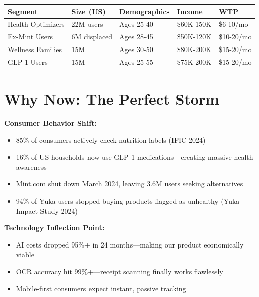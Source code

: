 \documentclass[11pt,a4paper]{report}
\begin{document}
\begin{center}
\renewcommand{\arraystretch}{1.5}
\begin{tabular}{>{\raggedright\arraybackslash}p{4cm} >{\centering\arraybackslash}p{2cm} >{\centering\arraybackslash}p{3cm} >{\centering\arraybackslash}p{2.5cm} >{\centering\arraybackslash}p{2cm}}
\toprule
\rowcolor{kbcblue!15}
\textbf{Segment} & \textbf{Size (US)} & \textbf{Demographics} & \textbf{Income} & \textbf{WTP} \\
\midrule
\rowcolor{healthgreen!8}
Health Optimizers & 22M users & Ages 25-40 & \$60K-150K & \$6-10/mo \\
Ex-Mint Users & 6M displaced & Ages 28-45 & \$50K-120K & \$10-20/mo \\
\rowcolor{healthgreen!8}
Wellness Families & 15M & Ages 30-50 & \$80K-200K & \$15-20/mo \\
GLP-1 Users & 15M+ & Ages 25-55 & \$75K-200K & \$15-20/mo \\
\bottomrule
\end{tabular}
\end{center}

\section{Why Now: The Perfect Storm}

\textbf{Consumer Behavior Shift:}
\begin{itemize}[leftmargin=2em, itemsep=4pt]
    \item 85\% of consumers actively check nutrition labels (IFIC 2024)
    \item 16\% of US households now use GLP-1 medications---creating massive health awareness
    \item Mint.com shut down March 2024, leaving 3.6M users seeking alternatives
    \item 94\% of Yuka users stopped buying products flagged as unhealthy (Yuka Impact Study 2024)
\end{itemize}

\textbf{Technology Inflection Point:}
\begin{itemize}[leftmargin=2em, itemsep=4pt]
    \item AI costs dropped 95\%+ in 24 months---making our product economically viable
    \item OCR accuracy hit 99\%+---receipt scanning finally works flawlessly
    \item Mobile-first consumers expect instant, passive tracking
\end{itemize}
\end{document}
